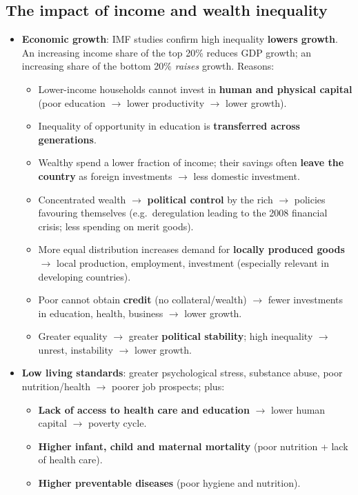 \documentclass[a4paper,12pt]{article}
\begin{document}
\subsection{The impact of income and wealth inequality}
\begin{itemize}
  \item \textbf{Economic growth}: IMF studies confirm high inequality \textbf{lowers growth}. An increasing income share of the top 20\% reduces GDP growth; an increasing share of the bottom 20\% \textit{raises} growth. Reasons:
  \begin{itemize}
    \item Lower-income households cannot invest in \textbf{human and physical capital} (poor education $\to$ lower productivity $\to$ lower growth).
    \item Inequality of opportunity in education is \textbf{transferred across generations}.
    \item Wealthy spend a lower fraction of income; their savings often \textbf{leave the country} as foreign investments $\to$ less domestic investment.
    \item Concentrated wealth $\to$ \textbf{political control} by the rich $\to$ policies favouring themselves (e.g.\ deregulation leading to the 2008 financial crisis; less spending on merit goods).
    \item More equal distribution increases demand for \textbf{locally produced goods} $\to$ local production, employment, investment (especially relevant in developing countries).
    \item Poor cannot obtain \textbf{credit} (no collateral/wealth) $\to$ fewer investments in education, health, business $\to$ lower growth.
    \item Greater equality $\to$ greater \textbf{political stability}; high inequality $\to$ unrest, instability $\to$ lower growth.
  \end{itemize}
  \item \textbf{Low living standards}: greater psychological stress, substance abuse, poor nutrition/health $\to$ poorer job prospects; plus:
  \begin{itemize}
    \item \textbf{Lack of access to health care and education} $\to$ lower human capital $\to$ poverty cycle.
    \item \textbf{Higher infant, child and maternal mortality} (poor nutrition + lack of health care).
    \item \textbf{Higher preventable diseases} (poor hygiene and nutrition).

\end{itemize}
\end{itemize}
\end{document}
